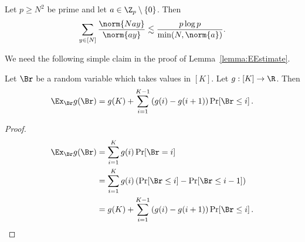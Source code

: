 \begin{lemma}\label{lemma:EEstimate}
 Let $p\geq N^2$ be prime and let $a\in \Z_p\setminus \{0\}$. Then
 $$\sum_{y \in [N]} \frac{\norm{Nay}}{\norm{ay}} \lesssim \frac{p\log p}{\min(N,\norm{a})}.$$
\end{lemma}

We need the following simple claim in the proof of Lemma~\ref{lemma:EEstimate}.
\begin{claim}\label{claim:partialsummation}
Let $\Br$ be a random variable which takes values in $[K]$. Let $g:[K] \to \R$. Then
\[ \Ex_\Br g(\Br) = g(K) + \sum_{i=1}^{K-1} \left(g(i)-g(i+1)\right) \Pr[\Br \leq i]\,. \]
\end{claim}
\begin{proof}
%
%
%
%
%
%
  \begin{align*}
  \Ex_\Br g(\Br)
   &=  \sum_{i=1}^{K} g(i) \Pr[\Br = i]\\
   &= \sum_{i=1}^{K} g(i) \left(\Pr[\Br \leq i] - \Pr[\Br \leq {i-1}]\right)\\
   &= g(K) +  \sum_{i=1}^{K-1} \left(g(i)-g(i+1)\right) \Pr[\Br \leq i]\,.
 \qedhere    %
  \end{align*}
\end{proof}


